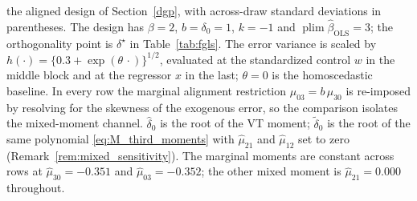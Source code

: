 \begin{table}[!h]
\begin{threeparttable}
\begin{tablenotes}
the aligned design of Section~\ref{dgp}, with across-draw standard deviations
in parentheses. The design has \(\beta=2\), \(b=\delta_0=1\), \(k=-1\) and
\(\operatorname{plim}\widehat\beta_{\mathrm{OLS}}=3\); the orthogonality point is
\(\delta^\star\) in Table~\ref{tab:fgls}. The error variance is scaled by
\(h(\cdot)=\{0.3+\exp(\theta\,\cdot)\}^{1/2}\), evaluated at the standardized
control \(w\) in the middle block and at the regressor \(x\) in the last;
\(\theta=0\) is the homoscedastic baseline. In every row the marginal alignment
restriction \(\mu_{03}=b\,\mu_{30}\) is re-imposed by resolving for the skewness
of the exogenous error, so the comparison isolates the mixed-moment channel.
\(\widehat\delta_0\) is the root of the VT moment; \(\widetilde\delta_0\) is the
root of the same polynomial \eqref{eq:M_third_moments} with \(\widehat\mu_{21}\)
and \(\widehat\mu_{12}\) set to zero (Remark~\ref{rem:mixed_sensitivity}). The
marginal moments are constant across rows at \(\widehat\mu_{30}=-0.351\) and
\(\widehat\mu_{03}=-0.352\); the other mixed moment is \(\widehat\mu_{21}=0.000\)
throughout.
\end{tablenotes}
\end{threeparttable}
\end{table}
